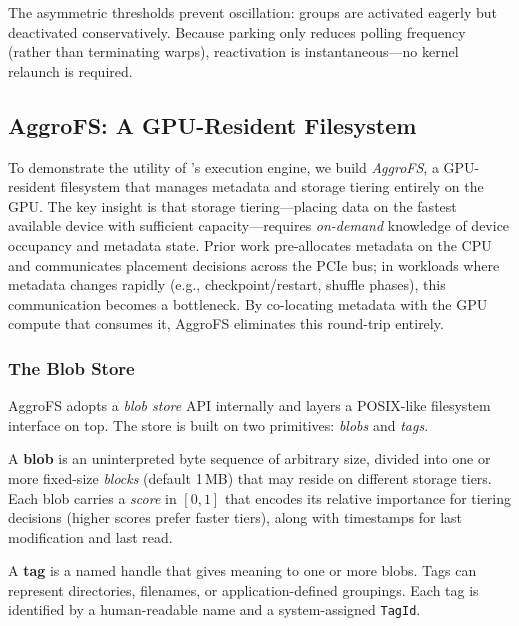 \noindent
The asymmetric thresholds prevent oscillation: groups are activated
eagerly but deactivated conservatively.  Because parking only reduces
polling frequency (rather than terminating warps), reactivation is
instantaneous---no kernel relaunch is required.

\subsection{AggroFS: A GPU-Resident Filesystem}
\label{sec:aggrofs}

To demonstrate the utility of \sysname{}'s execution engine, we
build \emph{AggroFS}, a GPU-resident filesystem that manages metadata
and storage tiering entirely on the GPU\@.
The key insight is that storage tiering---placing data on the
fastest available device with sufficient capacity---requires
\emph{on-demand} knowledge of device occupancy and metadata state.
Prior work pre-allocates metadata on the CPU and communicates
placement decisions across the PCIe bus; in workloads where metadata
changes rapidly (e.g., checkpoint/restart, shuffle phases), this
communication becomes a bottleneck.  By co-locating metadata with the
GPU compute that consumes it, AggroFS eliminates this round-trip
entirely.

\subsubsection{The Blob Store}
\label{sec:blobstore}

AggroFS adopts a \emph{blob store} API internally and layers a
POSIX-like filesystem interface on top.  The store is built on two
primitives: \emph{blobs} and \emph{tags}.

A \textbf{blob} is an uninterpreted byte sequence of arbitrary
size, divided into one or more fixed-size \emph{blocks} (default
1\,MB) that may reside on different storage tiers.  Each blob
carries a \emph{score} in $[0,1]$ that encodes its relative
importance for tiering decisions (higher scores prefer faster
tiers), along with timestamps for last modification and last read.

A \textbf{tag} is a named handle that gives meaning to one or more
blobs.  Tags can represent directories, filenames, or
application-defined groupings.  Each tag is identified by a
human-readable name and a system-assigned \texttt{TagId}.

